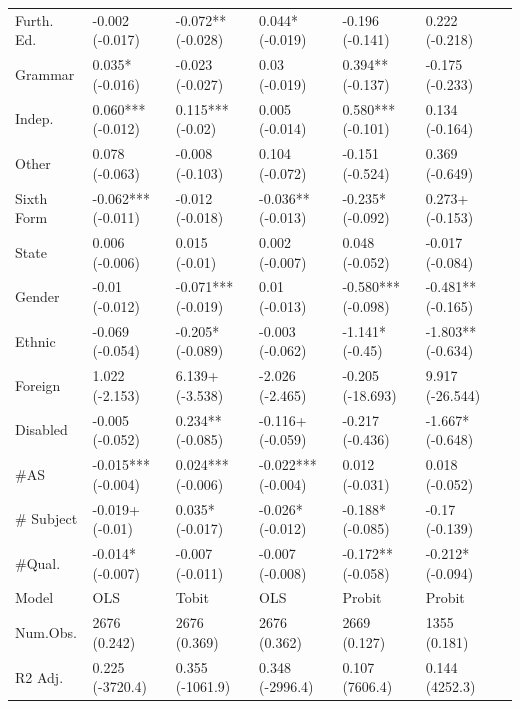 \begin{longtable}{lllllll}
Furth. Ed. & -0.002 
 (-0.017) & -0.072** 
 (-0.028) & 0.044* 
 (-0.019) & -0.196 
 (-0.141) & 0.222 
 (-0.218) \\
Grammar & 0.035* 
 (-0.016) & -0.023 
 (-0.027) & 0.03 
 (-0.019) & 0.394** 
 (-0.137) & -0.175 
 (-0.233) \\
Indep.  & 0.060*** 
 (-0.012) & 0.115*** 
 (-0.02) & 0.005 
 (-0.014) & 0.580*** 
 (-0.101) & 0.134 
 (-0.164) \\
Other & 0.078 
 (-0.063) & -0.008 
 (-0.103) & 0.104 
 (-0.072) & -0.151 
 (-0.524) & 0.369 
 (-0.649) \\
Sixth Form & -0.062*** 
 (-0.011) & -0.012 
 (-0.018) & -0.036** 
 (-0.013) & -0.235* 
 (-0.092) & 0.273+ 
 (-0.153) \\
State & 0.006 
 (-0.006) & 0.015 
 (-0.01) & 0.002 
 (-0.007) & 0.048 
 (-0.052) & -0.017 
 (-0.084) \\
Gender & -0.01 
 (-0.012) & -0.071*** 
 (-0.019) & 0.01 
 (-0.013) & -0.580*** 
 (-0.098) & -0.481** 
 (-0.165) \\
Ethnic & -0.069 
 (-0.054) & -0.205* 
 (-0.089) & -0.003 
 (-0.062) & -1.141* 
 (-0.45) & -1.803** 
 (-0.634) \\
Foreign & 1.022 
 (-2.153) & 6.139+ 
 (-3.538) & -2.026 
 (-2.465) & -0.205 
 (-18.693) & 9.917 
 (-26.544) \\
Disabled & -0.005 
 (-0.052) & 0.234** 
 (-0.085) & -0.116+ 
 (-0.059) & -0.217 
 (-0.436) & -1.667* 
 (-0.648) \\
\#AS & -0.015*** 
 (-0.004) & 0.024*** 
 (-0.006) & -0.022*** 
 (-0.004) & 0.012 
 (-0.031) & 0.018 
 (-0.052) \\
$\#$ Subject & -0.019+ 
 (-0.01) & 0.035* 
 (-0.017) & -0.026* 
 (-0.012) & -0.188* 
 (-0.085) & -0.17 
 (-0.139) \\
$\#$Qual. & -0.014* 
 (-0.007) & -0.007 
 (-0.011) & -0.007 
 (-0.008) & -0.172** 
 (-0.058) & -0.212* 
 (-0.094) \\
 \midrule
Model & OLS & Tobit & OLS & Probit & Probit \\
Num.Obs. & 2676 
 (0.242) & 2676 
 (0.369) & 2676 
 (0.362) & 2669 
 (0.127) & 1355 
 (0.181) \\
R2 Adj. & 0.225 
 (-3720.4) & 0.355 
 (-1061.9) & 0.348 
 (-2996.4) & 0.107 
 (7606.4) & 0.144 
 (4252.3) \\
\end{longtable}
